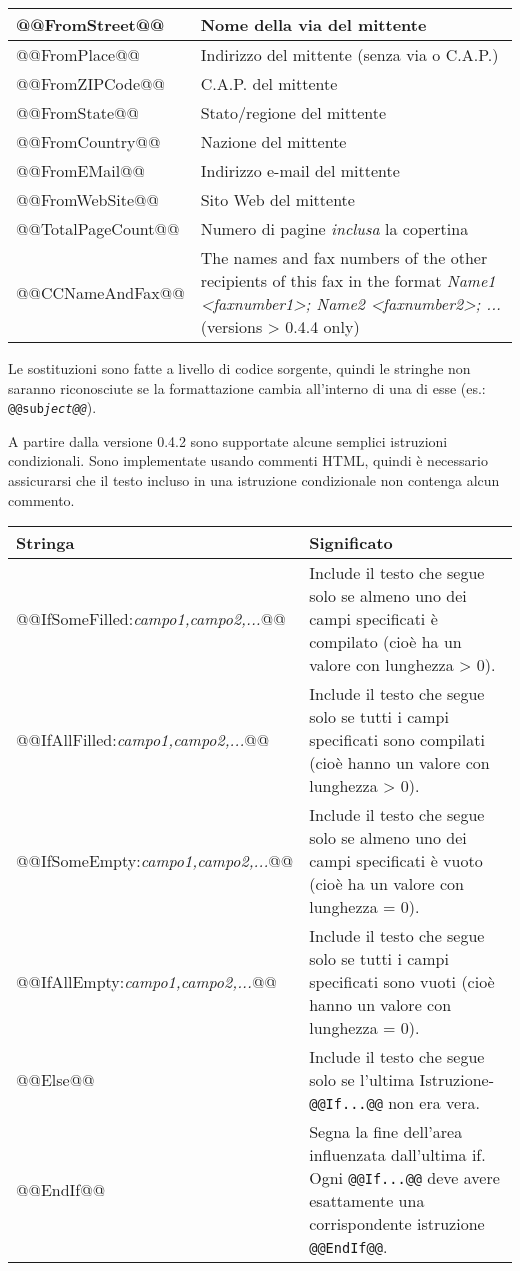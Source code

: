 \documentclass[a4paper,10pt]{scrartcl}
\begin{document}
\begin{center}
\begin{tabular}{|l|p{}|}
\ttfamily @@FromStreet@@ & Nome della via del mittente \\\hline
\ttfamily @@FromPlace@@ & Indirizzo del mittente (senza via o C.A.P.)\\\hline
\ttfamily @@FromZIPCode@@ & C.A.P. del mittente \\\hline
\ttfamily @@FromState@@ & Stato/regione del mittente\\\hline
\ttfamily @@FromCountry@@ & Nazione del mittente\\\hline
\ttfamily @@FromEMail@@ & Indirizzo e-mail del mittente\\\hline
\ttfamily @@FromWebSite@@ & Sito Web del mittente\\\hline
\ttfamily @@TotalPageCount@@ & Numero di pagine \textit{inclusa} la copertina \\\hline
\ttfamily @@CCNameAndFax@@ & The names and fax numbers of the other recipients of this fax in the format \textit{Name1 <faxnumber1>; Name2 <faxnumber2>; ...} (versions > 0.4.4 only)\\\hline
\end{tabular}
\end{center}

Le sostituzioni sono fatte a livello di codice sorgente, quindi le stringhe non saranno riconosciute se la formattazione cambia all'interno di una di esse (es.: \texttt{@@sub\textit{ject@@}}).

A partire dalla versione 0.4.2 sono supportate alcune semplici istruzioni condizionali. Sono implementate usando commenti HTML, quindi è necessario assicurarsi che il testo incluso in una istruzione condizionale non contenga alcun commento.
\begin{center}
\begin{tabular}{|l|p{}|}
\hline
\bfseries Stringa & \bfseries Significato \\
\hline\hline
\ttfamily @@IfSomeFilled:\textit{campo1,campo2,...}@@ & Include il testo che segue solo se almeno uno dei campi specificati è compilato (cioè ha un valore con lunghezza > 0).\\\hline
\ttfamily @@IfAllFilled:\textit{campo1,campo2,...}@@ & Include il testo che segue solo se tutti i campi specificati sono compilati (cioè hanno un valore con lunghezza > 0).\\\hline
\ttfamily @@IfSomeEmpty:\textit{campo1,campo2,...}@@ & Include il testo che segue solo se almeno uno dei campi specificati è vuoto (cioè ha un valore con lunghezza = 0).\\\hline
\ttfamily @@IfAllEmpty:\textit{campo1,campo2,...}@@ & Include il testo che segue solo se tutti i campi specificati sono vuoti (cioè hanno un valore con lunghezza = 0).\\\hline
\ttfamily @@Else@@ & Include il testo che segue solo se l'ultima Istruzione-\texttt{@@If...@@} non era vera.\\\hline
\ttfamily @@EndIf@@ & Segna la fine dell'area influenzata dall'ultima if. Ogni \texttt{@@If...@@} deve avere esattamente una corrispondente istruzione \texttt{@@EndIf@@}.\\\hline
\end{tabular}
\end{center}
\end{document}
